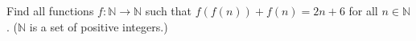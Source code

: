 \problem
Find all functions  $f \colon \mathbb{N} \to \mathbb{N}$ such that
$f(f(n)) + f(n) = 2 n + 6$ for all $n \in \mathbb{N}$.
($\mathbb{N}$ is a set of positive integers.)
\solution
\endproblem
